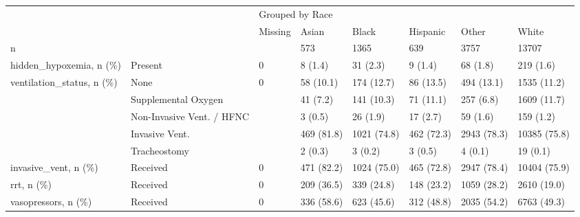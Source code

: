 \begin{tabular}{llllllll}
\toprule
                        &                                   & \multicolumn{6}{l}{Grouped by Race} \\
                        &                                   &         Missing &                     Asian &                     Black &                 Hispanic &                     Other &                    White \\
\midrule
n & {} &                 &                       573 &                      1365 &                      639 &                      3757 &                    13707 \\
hidden\_hypoxemia, n (\%) & Present &               0 &                   8 (1.4) &                  31 (2.3) &                  9 (1.4) &                  68 (1.8) &                219 (1.6) \\
ventilation\_status, n (\%) & None &               0 &                 58 (10.1) &                174 (12.7) &                86 (13.5) &                494 (13.1) &              1535 (11.2) \\
                        & Supplemental Oxygen &                 &                  41 (7.2) &                141 (10.3) &                71 (11.1) &                 257 (6.8) &              1609 (11.7) \\
                        & Non-Invasive Vent. / HFNC &                 &                   3 (0.5) &                  26 (1.9) &                 17 (2.7) &                  59 (1.6) &                159 (1.2) \\
                        & Invasive Vent. &                 &                469 (81.8) &               1021 (74.8) &               462 (72.3) &               2943 (78.3) &             10385 (75.8) \\
                        & Tracheostomy &                 &                   2 (0.3) &                   3 (0.2) &                  3 (0.5) &                   4 (0.1) &                 19 (0.1) \\
invasive\_vent, n (\%) & Received &               0 &                471 (82.2) &               1024 (75.0) &               465 (72.8) &               2947 (78.4) &             10404 (75.9) \\
rrt, n (\%) & Received &               0 &                209 (36.5) &                339 (24.8) &               148 (23.2) &               1059 (28.2) &              2610 (19.0) \\
vasopressors, n (\%) & Received &               0 &                336 (58.6) &                623 (45.6) &               312 (48.8) &               2035 (54.2) &              6763 (49.3) \\

\end{tabular}

